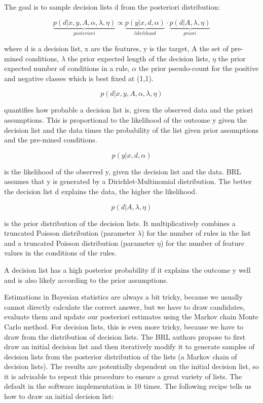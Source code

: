 \documentclass[12pt,]{krantz}
\begin{document}
The goal is to sample decision lists d from the posteriori distribution:

\[\underbrace{p(d|x,y,A,\alpha,\lambda,\eta)}_{posteriori}\propto\underbrace{p(y|x,d,\alpha)}_{likelihood}\cdot\underbrace{p(d|A,\lambda,\eta)}_{priori}\]

where d is a decision list, x are the features, y is the target, A the
set of pre-mined conditions, \(\lambda\) the prior expected length of
the decision lists, \(\eta\) the prior expected number of conditions in
a rule, \(\alpha\) the prior pseudo-count for the positive and negative
classes which is best fixed at (1,1).

\[p(d|x,y,A,\alpha,\lambda,\eta)\]

quantifies how probable a decision list is, given the observed data and
the priori assumptions. This is proportional to the likelihood of the
outcome y given the decision list and the data times the probability of
the list given prior assumptions and the pre-mined conditions.

\[p(y|x,d,\alpha)\]

is the likelihood of the observed y, given the decision list and the
data. BRL assumes that y is generated by a Dirichlet-Multinomial
distribution. The better the decision list d explains the data, the
higher the likelihood.

\[p(d|A,\lambda,\eta)\]

is the prior distribution of the decision lists. It multiplicatively
combines a truncated Poisson distribution (parameter \(\lambda\)) for
the number of rules in the list and a truncated Poisson distribution
(parameter \(\eta\)) for the number of feature values in the conditions
of the rules.

A decision list has a high posterior probability if it explains the
outcome y well and is also likely according to the prior assumptions.

Estimations in Bayesian statistics are always a bit tricky, because we
usually cannot directly calculate the correct answer, but we have to
draw candidates, evaluate them and update our posteriori estimates using
the Markov chain Monte Carlo method. For decision lists, this is even
more tricky, because we have to draw from the distribution of decision
lists. The BRL authors propose to first draw an initial decision list
and then iteratively modify it to generate samples of decision lists
from the posterior distribution of the lists (a Markov chain of decision
lists). The results are potentially dependent on the initial decision
list, so it is advisable to repeat this procedure to ensure a great
variety of lists. The default in the software implementation is 10
times. The following recipe tells us how to draw an initial decision
list:
\end{document}
